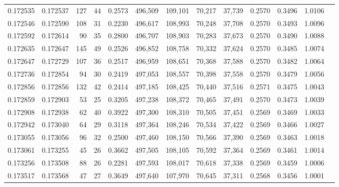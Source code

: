 \begin{tabular}{rrrrrrrrrrrrr}
0.172535 & 0.172537 &   127 &  44 &                                     0.2573 & 496,509 & 109,101 &  70,217 &  37,739 & 0.2570 & 0.3496 & 1.0106 \\
0.172546 & 0.172590 &   108 &  31 &                                     0.2230 & 496,617 & 108,993 &  70,248 &  37,708 & 0.2570 & 0.3493 & 1.0096 \\
0.172592 & 0.172614 &    90 &  35 &                                     0.2800 & 496,707 & 108,903 &  70,283 &  37,673 & 0.2570 & 0.3490 & 1.0088 \\
0.172635 & 0.172647 &   145 &  49 &                                     0.2526 & 496,852 & 108,758 &  70,332 &  37,624 & 0.2570 & 0.3485 & 1.0074 \\
0.172647 & 0.172729 &   107 &  36 &                                     0.2517 & 496,959 & 108,651 &  70,368 &  37,588 & 0.2570 & 0.3482 & 1.0064 \\
0.172736 & 0.172854 &    94 &  30 &                                     0.2419 & 497,053 & 108,557 &  70,398 &  37,558 & 0.2570 & 0.3479 & 1.0056 \\
0.172856 & 0.172856 &   132 &  42 &                                     0.2414 & 497,185 & 108,425 &  70,440 &  37,516 & 0.2571 & 0.3475 & 1.0043 \\
0.172859 & 0.172903 &    53 &  25 &                                     0.3205 & 497,238 & 108,372 &  70,465 &  37,491 & 0.2570 & 0.3473 & 1.0039 \\
0.172908 & 0.172938 &    62 &  40 &                                     0.3922 & 497,300 & 108,310 &  70,505 &  37,451 & 0.2569 & 0.3469 & 1.0033 \\
0.172942 & 0.173040 &    64 &  29 &                                     0.3118 & 497,364 & 108,246 &  70,534 &  37,422 & 0.2569 & 0.3466 & 1.0027 \\
0.173055 & 0.173056 &    96 &  32 &                                     0.2500 & 497,460 & 108,150 &  70,566 &  37,390 & 0.2569 & 0.3463 & 1.0018 \\
0.173061 & 0.173255 &    45 &  26 &                                     0.3662 & 497,505 & 108,105 &  70,592 &  37,364 & 0.2569 & 0.3461 & 1.0014 \\
0.173256 & 0.173508 &    88 &  26 &                                     0.2281 & 497,593 & 108,017 &  70,618 &  37,338 & 0.2569 & 0.3459 & 1.0006 \\
0.173517 & 0.173568 &    47 &  27 &                                     0.3649 & 497,640 & 107,970 &  70,645 &  37,311 & 0.2568 & 0.3456 & 1.0001 \\

\end{tabular}
